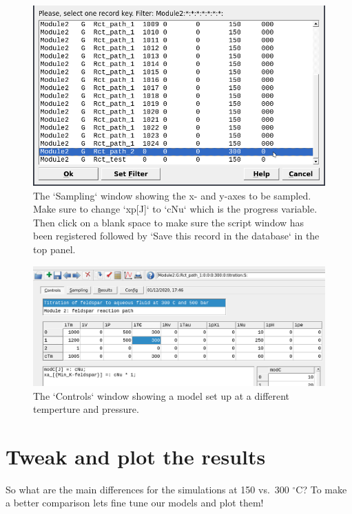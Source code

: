 \documentclass[
]{book}
\begin{document}
\begin{figure}
\includegraphics[width=0.7\linewidth]{figures/module2/fig-12} \caption{The `Sampling` window showing the x- and y-axes to be sampled. Make sure to change `xp[J]` to `cNu` which is the progress variable. Then click on a blank space to make sure the script window has been registered followed by `Save this record in the database` in the top panel.}\label{fig:fig-12b}
\end{figure}

\begin{figure}
\includegraphics[width=0.8\linewidth]{figures/module2/fig-13} \caption{The `Controls` window showing a model set up at a different temperture and pressure.}\label{fig:fig-13b}
\end{figure}

\hypertarget{tweak-and-plot-the-results}{%
\section{Tweak and plot the results}\label{tweak-and-plot-the-results}}

So what are the main differences for the simulations at 150 vs.~300 \(^\circ\)C? To make a better comparison lets fine tune our models and plot them!
\end{document}
